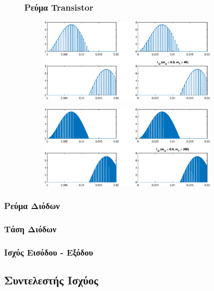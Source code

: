 \begin{figure}[h!]
	\subsubsection*{Ρεύμα Transistor}
	\begin{subfigure}{0.49\textwidth}
		\centering
		\includegraphics[width=0.95\textwidth]{Images/I_Q_40}
	\end{subfigure}
	\begin{subfigure}{0.49\textwidth}
		\centering
		\includegraphics[width=0.95\textwidth]{Images/I_Q_200}
	\end{subfigure}
\end{figure}


\subsubsection*{Ρεύμα Διόδων}
\subsubsection*{Τάση Διόδων}

\subsubsection*{Ισχύς Εισόδου - Εξόδου}


\subsection{Συντελεστής Ισχύος}